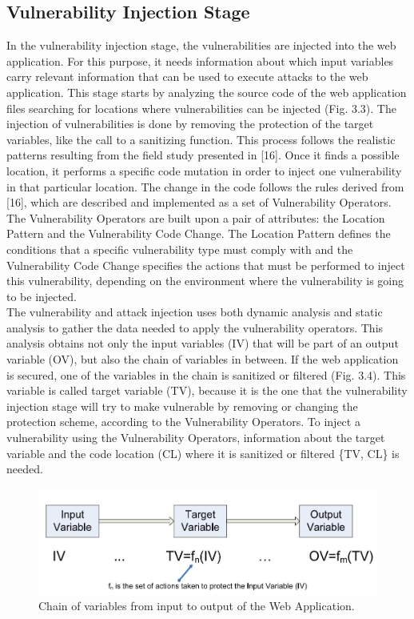 \subsection{Vulnerability Injection Stage}
 In the vulnerability injection stage, the vulnerabilities
are injected into the web application. For this purpose, it
needs information about which input variables carry relevant information that can be used to execute attacks to the web application. This stage starts by analyzing the
source code of the web application files searching for locations where vulnerabilities can be injected (Fig. 3.3). The injection of vulnerabilities is done by removing the protection of the target variables, like the call to a sanitizing
function. This process follows the realistic patterns resulting from the field study presented in [16]. Once it finds a
possible location, it performs a specific code mutation in
order to inject one vulnerability in that particular location.
The change in the code follows the rules derived from
[16], which are described and implemented as a set of
Vulnerability Operators.\\
\newline
The Vulnerability Operators are built upon a pair of
attributes: the Location Pattern and the Vulnerability Code
Change. The Location Pattern defines the conditions that
a specific vulnerability type must comply with and the
Vulnerability Code Change specifies the actions that
must be performed to inject this vulnerability, depending
on the environment where the vulnerability is going to
be injected.\\
\newline
The vulnerability and attack injection uses both
dynamic analysis and static analysis to gather the data
needed to apply the vulnerability operators. This analysis obtains not only the input variables (IV) that will be
part of an output variable (OV), but also the chain of variables in between. If the web application is secured, one
of the variables in the chain is sanitized or filtered
(Fig. 3.4). This variable is called target variable (TV),
because it is the one that the vulnerability injection stage
will try to make vulnerable by removing or changing the
protection scheme, according to the Vulnerability Operators. To inject a vulnerability using the Vulnerability
Operators, information about the target variable and the code location (CL) where it is sanitized or
filtered \{TV, CL\} is needed.
\begin{figure}
\centering
\includegraphics[width=0.7\linewidth]{Main/Fig4}
\caption{Chain of variables from input to output of the Web Application.}
\label{fig:Fig4}
\end{figure}\\
